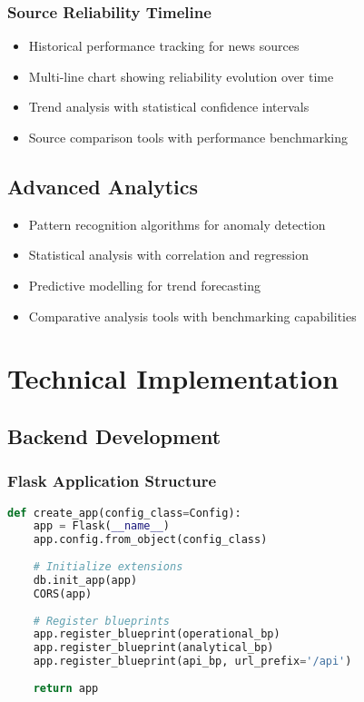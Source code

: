\documentclass[12pt,a4paper]{article}
\begin{document}
\subsubsection{Source Reliability Timeline}
\begin{itemize}
    \item Historical performance tracking for news sources
    \item Multi-line chart showing reliability evolution over time
    \item Trend analysis with statistical confidence intervals
    \item Source comparison tools with performance benchmarking
\end{itemize}

\subsection{Advanced Analytics}
\begin{itemize}
    \item Pattern recognition algorithms for anomaly detection
    \item Statistical analysis with correlation and regression
    \item Predictive modelling for trend forecasting
    \item Comparative analysis tools with benchmarking capabilities
\end{itemize}

\section{Technical Implementation}

\subsection{Backend Development}

\subsubsection{Flask Application Structure}
\begin{lstlisting}[language=Python, caption=Flask Application Factory]
def create_app(config_class=Config):
    app = Flask(__name__)
    app.config.from_object(config_class)
    
    # Initialize extensions
    db.init_app(app)
    CORS(app)
    
    # Register blueprints
    app.register_blueprint(operational_bp)
    app.register_blueprint(analytical_bp)
    app.register_blueprint(api_bp, url_prefix='/api')
    
    return app
\end{lstlisting}
\end{document}
